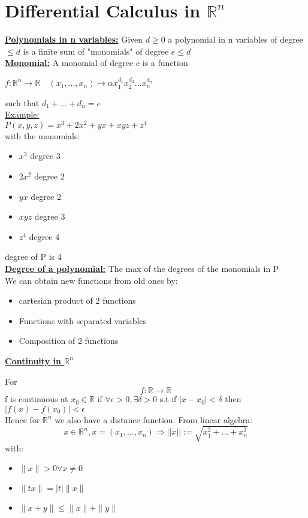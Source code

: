 \documentclass[8pt]{extreport}
\newcommand{\R}{\mathbb{R}}
\begin{document}
\chapter{Differential Calculus in $\mathbb{R}^n$}

\underline{\textbf{Polynomials in n variables:}} Given $d \geq 0$ a polynomial in n variables of degree $\leq d$ is a finite sum of "monomials" of degree $e \leq d$\\
\underline{\textbf{Monomial:}} A monomial of degree e is a function 
\begin{center}
$f: \R^ n \to \R \quad (x_1,...,x_n) \mapsto \alpha x_1^{d_1}x_2^{d_2}...x_n^{d_n}$  
\end{center}
such that $d_1 + ... + d_n = e$\\
\underline{Example:}\\
$P(x,y,z) = x^3 + 2x^2 + yx + xyz + z^4$\\
with the monomials:
\begin{itemize}
\item $x^3$ degree 3
\item $2x^2$ degree 2
\item $yx$ degree 2
\item $xyz$ degree 3
\item $z^4$ degree 4
\end{itemize}
degree of P is 4\\
\underline{\textbf{Degree of a polynomial:}} The max of the degrees of the monomials in P\\

We can obtain new functions from old ones by:
\begin{itemize}
\item cartesian product of 2 functions
\item Functions with separated variables
\item Composition of 2 functions
\end{itemize}
 

\underline{\textbf{Continuity in $\R^n$}}

For $$f: \R \to \R$$
f is continuous at $x_0 \in \R$ if $\forall \epsilon > 0, \exists \delta > 0$ s.t if $|x-x_0| < \delta$ then $|f(x) -f(x_0)| < \epsilon$\\
Hence for $\R^n$ we also have a distance function. From linear algebra:
$$ x \in \R^n, x=(x_1,...,x_n) \Rightarrow ||x|| := \sqrt{x_1^2 + ... + x_n^2}$$
with:
\begin{itemize}
\item $\|x \| > 0 \forall x \neq 0$
\item $\|tx\| = |t|\|x\|$
\item $\|x + y\| \leq \|x\| + \|y\|$
\end{itemize}
\end{document}
